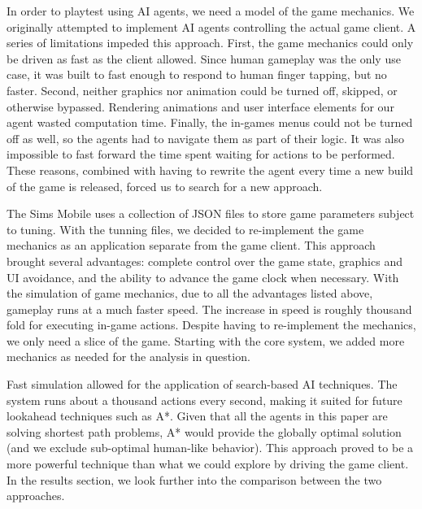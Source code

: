 \documentclass[letterpaper]{article} %
\begin{document}
In order to playtest using AI agents, we need a model of the game mechanics. We originally attempted to implement AI agents controlling the actual game client. A series of limitations impeded this approach. First, the game mechanics could only be driven as fast as the client allowed. Since human gameplay was the only use case, it was built to fast enough to respond to human finger tapping, but no faster.  Second, neither graphics nor animation could be turned off, skipped, or otherwise bypassed. Rendering animations and user interface elements for our agent wasted computation time. Finally, the in-games menus could not be turned off as well, so the agents had to navigate them as part of their logic. It was also impossible to fast forward the time spent waiting for actions to be performed. These reasons, combined with having to rewrite the agent every time a new build of the game is released, forced us to search for a new approach.

The Sims Mobile uses a collection of JSON files to store game parameters subject to tuning.
With the tunning files, we decided to re-implement the game mechanics as an application separate from the game client. This approach brought several advantages: complete control over the game state, graphics and UI avoidance, and the ability to advance the game clock when necessary. With the simulation of game mechanics, due to all the advantages listed above, gameplay runs at a much faster speed. The increase in speed is roughly thousand fold for  executing in-game actions. Despite having to re-implement the mechanics, we only need a slice of the game. Starting with the core system, we added more mechanics as needed for the analysis in question.

Fast simulation allowed for the application of search-based AI techniques. The system runs about a thousand actions every second, making it suited for future lookahead techniques such as A*. Given that all the agents in this paper are solving shortest path problems, A* would provide the globally optimal solution (and we exclude sub-optimal human-like behavior). This approach proved to be a more powerful technique than what we could explore by driving the game client. In the results section, we look further into the comparison between the two approaches.
\end{document}
